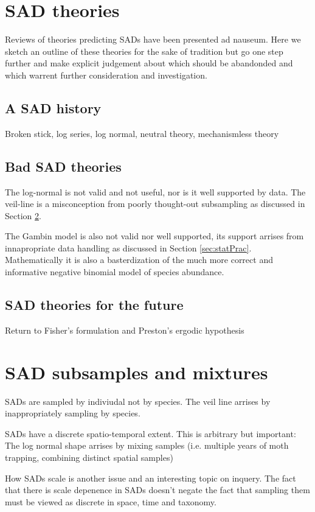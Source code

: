 \documentclass[12pt]{article}
\begin{document}
\section{SAD theories}
Reviews of theories predicting SADs have been presented ad
nauseum. Here we sketch an outline of these theories for the sake of
tradition but go one step further and make explicit judgement about
which should be abandonded and which warrent further consideration and
investigation.

\subsection{A SAD history}
Broken stick, log series, log normal, neutral theory, mechanismless
theory

\subsection{Bad SAD theories}
The log-normal is not valid and not useful, nor is it well supported
by data. The veil-line is a misconception from poorly thought-out
subsampling as discussed in Section \ref{sec:samp}.

The Gambin model is also not valid nor well supported, its support
arrises from innapropriate data handling as discussed in Section
\ref{sec:statPrac}. Mathematically it is also a basterdization of the
much more correct and informative negative binomial model of species
abundance.

\subsection{SAD theories for the future}
Return to Fisher's formulation and Preston's ergodic hypothesis


\section{SAD subsamples and mixtures}
\label{sec:samp}

SADs are sampled by indiviudal not by species. The veil line arrises
by inappropriately sampling by species.

SADs have a discrete spatio-temporal extent. This is arbitrary but
important: The log normal shape arrises by mixing samples
(i.e. multiple years of moth trapping, combining distinct spatial
samples)

How SADs scale is another issue and an interesting topic on inquery.
The fact that there is scale depenence in SADs doesn't negate the fact
that sampling them must be viewed as discrete in space, time and
taxonomy.
\end{document}
